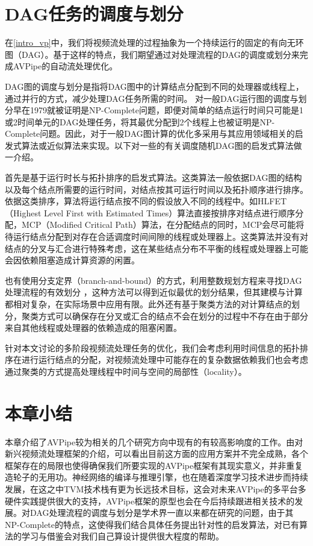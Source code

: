 \section{DAG任务的调度与划分}\label{ch2:dag_sched}
在\ref{intro_vp}中，我们将视频流处理的过程抽象为一个持续运行的固定的有向无环图（DAG）。基于这样的特点，我们期望通过对处理流程的DAG的调度或划分来完成AVPipe的自动流处理优化。\par
DAG图的调度与划分是指将DAG图中的计算结点分配到不同的处理器或线程上，通过并行的方式，减少处理DAG任务所需的时间。
对一般DAG运行图的调度与划分早在1979就被证明是NP-Complete问题\cite{garey1979computers}，即便对简单的结点运行时间只可能是1或2时间单元的DAG处理任务，将其最优分配到2个线程上也被证明是NP-Complete问题。因此，对于一般DAG图计算的优化多采用与其应用领域相关的启发式算法或近似算法来实现\cite{kwok1999static}。以下对一些的有关调度随机DAG图的启发式算法做一介绍。\par
首先是基于运行时长与拓扑排序的启发式算法。这类算法一般依据DAG图的结构以及每个结点所需要的运行时间，对结点按其可运行时间以及拓扑顺序进行排序。依据这类排序，算法将运行结点按不同的假设放入不同的线程中。如HLFET（Highest Level First with Estimated Times）算法\cite{adam1974comparison}直接按排序对结点进行顺序分配，MCP（Modified Critical Path）算法\cite{wu1990hypertool}，在分配结点的同时，MCP会尽可能将待运行结点分配到对存在合适调度时间间隙的线程或处理器上。这类算法并没有对结点的分叉与汇合进行特殊考虑，这在某些结点分布不平衡的线程或处理器上可能会因依赖阻塞造成计算资源的闲置。\par
也有使用分支定界（branch-and-bound）的方式，利用整数规划方程来寻找DAG处理流程的有效划分 \cite{nossack2014branch}，这种方法可以得到近似最优的划分结果，但其建模与计算都相对复杂，在实际场景中应用有限。此外还有基于聚类方法的对计算结点的划分\cite{wong2003clustering}，聚类方式可以确保存在分叉或汇合的结点不会在划分的过程中不存在由于部分来自其他线程或处理器的依赖造成的阻塞闲置。\par
针对本文讨论的多阶段视频流处理任务的优化，我们会考虑利用时间信息的拓扑排序在进行运行结点的分配，对视频流处理中可能存在的复杂数据依赖我们也会考虑通过聚类的方式提高处理线程中时间与空间的局部性（locality）。\par

\section{本章小结}
本章介绍了AVPipe较为相关的几个研究方向中现有的有较高影响度的工作。由对新兴视频流处理框架的介绍，可以看出目前这方面的应用方案并不完全成熟，各个框架存在的局限也使得确保我们所要实现的AVPipe框架有其现实意义，并非重复造轮子的无用功。神经网络的编译与推理引擎，也在随着深度学习技术进步而持续发展，在这之中TVM技术栈有更为长远技术目标，这会对未来AVPipe的多平台多硬件实践提供很大的支持，AVPipe框架的原型也会在今后持续跟进相关技术的发展。对DAG处理流程的调度与划分是学术界一直以来都在研究的问题，由于其NP-Complete的特点，这使得我们结合具体任务提出针对性的启发算法，对已有算法的学习与借鉴会对我们自己算设计提供很大程度的帮助。